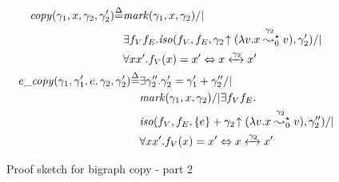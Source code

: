 \begin{figure}
\begin{gather*}
\begin{split}
  \mathit{copy}(\gamma_1, x, \gamma_2, \gamma_2')\mathbin{\stackrel{\Delta}{=}} &\mathit{mark}(\gamma_1,x, \gamma_2) /| \\
   & \exists f_V f_E. \mathit{iso}(f_V, f_E,  \gamma_2\!\uparrow(\lambda v. x\mathrel{{\stackrel{\gamma_2~}{\leadsto^{\star}_{0}}}} v), \gamma_2') /| \\
   & \forall x x'. f_V(x) = x' \Leftrightarrow x \xleftrightarrow{\gamma_2} x'
  \end{split}\\
  \begin{split}
  \mathit{e\_copy}(\gamma_1, \gamma_1', e, \gamma_2, \gamma_2')\mathbin{\stackrel{\Delta}{=}} & \exists \gamma_2''. \gamma_2' = \gamma_1' + \gamma_2'' /| \\
  & \mathit{mark}(\gamma_1,x, \gamma_2) /| \exists f_V f_E.  \\
   & \mathit{iso}(f_V, f_E,  \{e\} +\gamma_2\!\uparrow(\lambda v. x\mathrel{{\stackrel{\gamma_2~}{\leadsto^{\star}_{0}}}} v), \gamma_2'') /| \\
   & \forall x x'. f_V(x) = x' \Leftrightarrow x \xleftrightarrow{\gamma_2} x'
  \end{split}\\
\end{gather*}
\caption{Proof sketch for bigraph copy - part 2}
\label{fig:copy-part2}
\end{figure}
